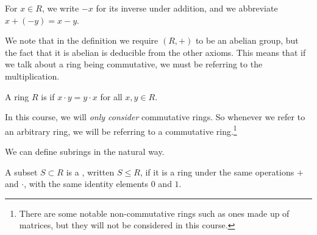 \documentclass[a4paper]{scrartcl}
\begin{document}
\begin{remark}[Notation]
	For $x \in R$, we write $-x$ for its inverse under addition, and we abbreviate $x + (-y) = x - y$.
\end{remark}

We note that in the definition we require $(R, +)$ to be an abelian group, but the fact that it is abelian is deducible from the other axioms. This means that if we talk about a ring being commutative, we must be referring to the multiplication.

\begin{definition}
	A ring $R$ is  if $x \cdot y = y \cdot x$ for all $x, y \in R$.
\end{definition}

In this course, we will \emph{only consider} commutative rings. So whenever we refer to an arbitrary ring, we will be referring to a commutative ring.\footnote{There are some notable non-commutative rings such as ones made up of matrices, but they will not be considered in this course.}




We can define subrings in the natural way.

\begin{definition}[Subrings]
	A subset $S \subset R$ is a , written $S \leq R$, if it is a ring under the same operations $+$ and $\cdot$, with the same identity elements $0$ and $1$.
 \end{definition}
\end{document}
